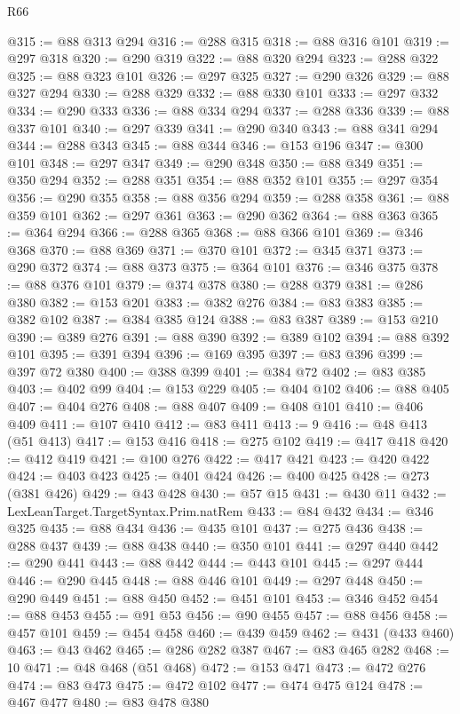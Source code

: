 \begin{lexlean}{R66}
\begin{coremodule}
@315 := @88 @313 @294
@316 := @288 @315
@318 := @88 @316 @101
@319 := @297 @318
@320 := @290 @319
@322 := @88 @320 @294
@323 := @288 @322
@325 := @88 @323 @101
@326 := @297 @325
@327 := @290 @326
@329 := @88 @327 @294
@330 := @288 @329
@332 := @88 @330 @101
@333 := @297 @332
@334 := @290 @333
@336 := @88 @334 @294
@337 := @288 @336
@339 := @88 @337 @101
@340 := @297 @339
@341 := @290 @340
@343 := @88 @341 @294
@344 := @288 @343
@345 := @88 @344
@346 := @153 @196
@347 := @300 @101
@348 := @297 @347
@349 := @290 @348
@350 := @88 @349
@351 := @350 @294
@352 := @288 @351
@354 := @88 @352 @101
@355 := @297 @354
@356 := @290 @355
@358 := @88 @356 @294
@359 := @288 @358
@361 := @88 @359 @101
@362 := @297 @361
@363 := @290 @362
@364 := @88 @363
@365 := @364 @294
@366 := @288 @365
@368 := @88 @366 @101
@369 := @346 @368
@370 := @88 @369
@371 := @370 @101
@372 := @345 @371
@373 := @290 @372
@374 := @88 @373
@375 := @364 @101
@376 := @346 @375
@378 := @88 @376 @101
@379 := @374 @378
@380 := @288 @379
@381 := @286 @380
@382 := @153 @201
@383 := @382 @276
@384 := @83 @383
@385 := @382 @102
@387 := @384 @385 @124
@388 := @83 @387
@389 := @153 @210
@390 := @389 @276
@391 := @88 @390
@392 := @389 @102
@394 := @88 @392 @101
@395 := @391 @394
@396 := @169 @395
@397 := @83 @396
@399 := @397 @72 @380
@400 := @388 @399
@401 := @384 @72
@402 := @83 @385
@403 := @402 @99
@404 := @153 @229
@405 := @404 @102
@406 := @88 @405
@407 := @404 @276
@408 := @88 @407
@409 := @408 @101
@410 := @406 @409
@411 := @107 @410
@412 := @83 @411
@413 := 9
@416 := @48 @413 (@51 @413)
@417 := @153 @416
@418 := @275 @102
@419 := @417 @418
@420 := @412 @419
@421 := @100 @276
@422 := @417 @421
@423 := @420 @422
@424 := @403 @423
@425 := @401 @424
@426 := @400 @425
@428 := @273 (@381 @426)
@429 := @43 @428
@430 := @57 @15
@431 := @430 @11
@432 := LexLeanTarget.TargetSyntax.Prim.natRem
@433 := @84 @432
@434 := @346 @325
@435 := @88 @434
@436 := @435 @101
@437 := @275 @436
@438 := @288 @437
@439 := @88 @438
@440 := @350 @101
@441 := @297 @440
@442 := @290 @441
@443 := @88 @442
@444 := @443 @101
@445 := @297 @444
@446 := @290 @445
@448 := @88 @446 @101
@449 := @297 @448
@450 := @290 @449
@451 := @88 @450
@452 := @451 @101
@453 := @346 @452
@454 := @88 @453
@455 := @91 @53
@456 := @90 @455
@457 := @88 @456
@458 := @457 @101
@459 := @454 @458
@460 := @439 @459
@462 := @431 (@433 @460)
@463 := @43 @462
@465 := @286 @282 @387
@467 := @83 @465 @282
@468 := 10
@471 := @48 @468 (@51 @468)
@472 := @153 @471
@473 := @472 @276
@474 := @83 @473
@475 := @472 @102
@477 := @474 @475 @124
@478 := @467 @477
@480 := @83 @478 @380

\end{coremodule}
\end{lexlean}
